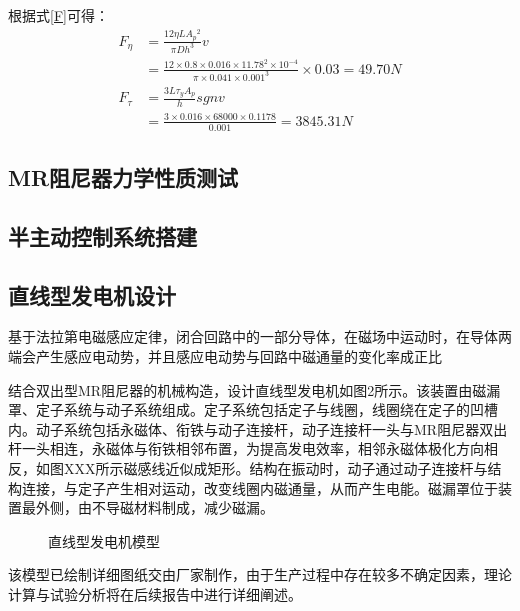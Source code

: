 根据式\eqref{F}可得：
\begin{equation}
\begin{split}
F_\eta&=\frac{12\eta LA{_p}{^2}}{\pi Dh^3}v\\&=\frac{12\times0.8\times0.016\times11.78^2\times10^{-4}}{\pi\times0.041\times0.001^3}\times0.03=49.70N
\\
F_{\tau}&=\frac{3L\tau_yA_p}{h}sgnv\\&=\frac{3\times0.016\times68000\times0.1178}{0.001}=3845.31N
\end{split}
\end{equation}

\subsection{MR阻尼器力学性质测试}









\subsection{半主动控制系统搭建}






\subsection{直线型发电机设计}
基于法拉第电磁感应定律，闭合回路中的一部分导体，在磁场中运动时，在导体两端会产生感应电动势，并且感应电动势与回路中磁通量的变化率成正比\cite{elliott1993electromagnetics}

结合双出型MR阻尼器的机械构造，设计直线型发电机如图2所示。该装置由磁漏罩、定子系统与动子系统组成。定子系统包括定子与线圈，线圈绕在定子的凹槽内。动子系统包括永磁体、衔铁与动子连接杆，动子连接杆一头与MR阻尼器双出杆一头相连，永磁体与衔铁相邻布置，为提高发电效率，相邻永磁体极化方向相反，如图XXX所示磁感线近似成矩形。结构在振动时，动子通过动子连接杆与结构连接，与定子产生相对运动，改变线圈内磁通量，从而产生电能。磁漏罩位于装置最外侧，由不导磁材料制成，减少磁漏。

\begin{figure}[H]
\centering
\caption{直线型发电机模型}
\end{figure}
该模型已绘制详细图纸交由厂家制作，由于生产过程中存在较多不确定因素，理论计算与试验分析将在后续报告中进行详细阐述。